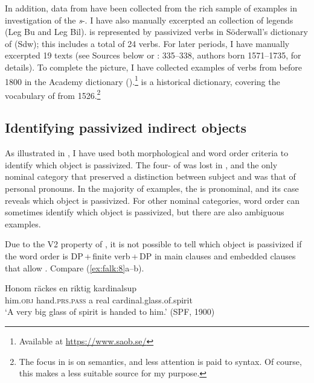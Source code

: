 \documentclass[output=paper]{langscibook}
\begin{document}
In addition, data from  have been collected from the rich sample of examples in  investigation of the \textit{s}{}-. I have also manually excerpted an  collection of legends (Leg Bu and Leg Bil).  is represented by passivized  verbs in Söderwall’s dictionary of  (Sdw); this includes a total of 24 verbs. For later periods, I have manually excerpted 19 texts (see Sources below or \citealt{Falk1993}: 335–338, authors born 1571–1735, for details). To complete the picture, I have collected examples of  verbs from before 1800 in the  Academy dictionary ().\footnote{Available at \url{https://www.saob.se/}}   is a historical dictionary, covering the vocabulary of  from 1526.\footnote{The focus in  is on semantics, and less attention is paid to syntax. Of course, this makes  a less suitable source for my purpose.}


\subsection{Identifying passivized indirect objects}\label{sec:falk:3.2}


As illustrated in , I have used both morphological and word order criteria to identify which object is passivized. The four- of  was lost in , and the only nominal category that preserved a distinction between subject and  was that of personal pronouns. In the majority of examples, the  is pronominal, and its case reveals which object is passivized. For other nominal categories, word order can sometimes identify which object is passivized, but there are also ambiguous examples.


Due to the V2 property of , it is not possible to tell which object is passivized if the word order is DP\,+\,finite verb\,+\,DP in main clauses and embedded clauses that allow . Compare (\ref{ex:falk:8}a–b).


\ea%
    \label{ex:falk:8}
\ea \label{ex:falk:8a}
\gll Honom  räckes        en    riktig  kardinalsup\\
      him.\textsc{obj}  hand\textsc{.prs}.\textsc{pass}  a      real   cardinal.glass.of.spirit\\
\glt ‘A very big glass of spirit is handed to him.’ (SPF, 1900)
\end{document}
